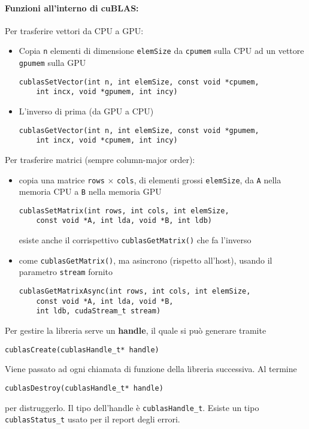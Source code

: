 \paragraph{Funzioni all'interno di cuBLAS:} Per trasferire vettori da CPU a GPU:
\begin{itemize}
	\item Copia \texttt{n} elementi di dimensione \texttt{elemSize} da \texttt{cpumem} sulla CPU ad un vettore \texttt{gpumem} sulla GPU
	\begin{verbatim}
cublasSetVector(int n, int elemSize, const void *cpumem, 
    int incx, void *gpumem, int incy)
	\end{verbatim}
	
	\item L'inverso di prima (da GPU a CPU)
	\begin{verbatim}
cublasGetVector(int n, int elemSize, const void *gpumem, 
    int incx, void *cpumem, int incy)
	\end{verbatim}
\end{itemize}

Per trasferire matrici (sempre column-major order): 
\begin{itemize}
	\item copia una matrice \texttt{rows} $\times$ \texttt{cols}, di elementi grossi \texttt{elemSize}, da \texttt{A} nella memoria CPU a \texttt{B} nella memoria GPU
	\begin{verbatim}
cublasSetMatrix(int rows, int cols, int elemSize, 
    const void *A, int lda, void *B, int ldb)
	\end{verbatim}
	esiste anche il corrispettivo \texttt{cublasGetMatrix()} che fa l'inverso
	
	\item come \texttt{cublasGetMatrix()}, ma asincrono (rispetto all'host), usando il parametro \texttt{stream} fornito
	\begin{verbatim}
cublasGetMatrixAsync(int rows, int cols, int elemSize, 
    const void *A, int lda, void *B, 
    int ldb, cudaStream_t stream)
	\end{verbatim}
\end{itemize}

Per gestire la libreria serve un \textbf{handle}, il quale si può generare tramite
\begin{verbatim}
cublasCreate(cublasHandle_t* handle)
\end{verbatim}

Viene passato ad ogni chiamata di funzione della libreria successiva. Al termine
\begin{verbatim}
cublasDestroy(cublasHandle_t* handle)
\end{verbatim}
per distruggerlo. Il tipo dell'handle è \texttt{cublasHandle\_t}. Esiste un tipo \texttt{cublasStatus\_t} usato per il report degli errori.

